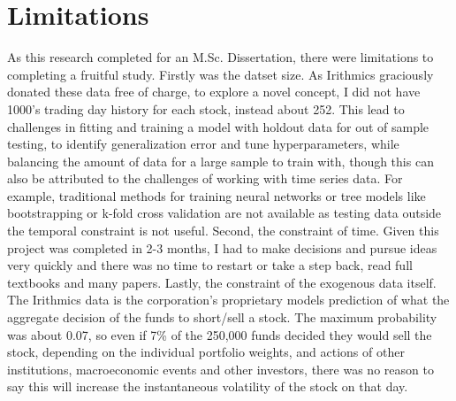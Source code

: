\section{Limitations}
As this research completed for an M.Sc. Dissertation, there were limitations to completing a fruitful study. Firstly was the datset size. As Irithmics graciously donated these data free of charge, to explore a novel concept, I did not have 1000's trading day history for each stock, instead about 252. This lead to challenges in fitting and training a model with holdout data for out of sample testing, to identify generalization error and tune hyperparameters, while balancing the amount of data for a large sample to train with, though this can also be attributed to the challenges of working with time series data. For example, traditional methods for training neural networks or tree models like bootstrapping or k-fold cross validation are not available as testing data outside the temporal constraint is not useful. Second, the constraint of time. Given this project was completed in 2-3 months, I had to make decisions and pursue ideas very quickly and there was no time to restart or take a step back, read full textbooks and many papers. Lastly, the constraint of the exogenous data itself. The Irithmics data is the corporation's proprietary models prediction of what the aggregate decision of the funds to short/sell a stock. The maximum probability was about 0.07, so even if 7\% of the 250,000 funds decided they would sell the stock, depending on the individual portfolio weights, and actions of other institutions, macroeconomic events and other investors, there was no reason to say this will increase the instantaneous volatility of the stock on that day.  


